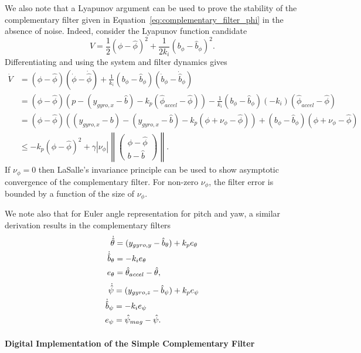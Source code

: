 We also note that a Lyapunov argument can be used to prove the stability of the complementary filter given in Equation~\eqref{eq:complementary_filter_phi} in the absence of noise.  Indeed, consider the Lyapunov function candidate
$$
V = \frac{1}{2}(\phi-\hat{\phi})^2 + \frac{1}{2k_i}(b_\phi-\hat{b}_\phi)^2.
$$
Differentiating and using the system and filter dynamics gives
\begin{align*}
\dot{V} &= (\phi - \hat{\phi})(\dot{\phi}-\dot{\hat{\phi}}) + \frac{1}{k_i}(b_\phi-\hat{b}_\phi)(\dot{b}_\phi - \dot{\hat{b}}_\phi) \\
&= (\phi - \hat{\phi})(p - (y_{gyro,x}-\hat{b}) - k_p (\hat{\phi}_{accel}-\hat{\phi})) - \frac{1}{k_i}(b_\phi-\hat{b}_\phi)(-k_i)(\hat{\phi}_{accel}-\hat{\phi}) \\
&= (\phi - \hat{\phi})((y_{gyro,x}-b) - (y_{gyro,x}-\hat{b}) - k_p (\phi + \nu_\phi -\hat{\phi})) + (b_\phi-\hat{b}_\phi)(\phi + \nu_\phi -\hat{\phi}) \\
&\leq -k_p (\phi-\hat{\phi})^2 + \gamma |\nu_\phi|\left\|\begin{pmatrix}\phi-\hat{\phi} \\ b-\hat{b}\end{pmatrix}\right\|.
\end{align*}
If $\nu_\phi=0$ then LaSalle's invariance principle can be used to show asymptotic convergence of the complementary filter.  For non-zero $\nu_\phi$, the filter error is bounded by a function of the size of $\nu_\phi$.

We note also that for Euler angle representation for pitch and yaw, a similar derivation results in the complementary filters
\begin{align}
\dot{\hat{\theta}} &= (y_{gyro,y}-\hat{b}_\theta) + k_p e_\theta \notag \\
\dot{\hat{b}}_\theta &= -k_i e_\theta \label{eq:complementary_filter_theta} \\
e_\theta &= \hat{\theta}_{accel}-\hat{\theta}, \notag
\end{align}
\begin{align}
\dot{\hat{\psi}} &= (y_{gyro,z}-\hat{b}_\psi) + k_p e_\psi \notag \\
\dot{\hat{b}}_\psi &= -k_i e_\psi \label{eq:complementary_filter_psi} \\
e_\psi &= \hat{\psi}_{mag}-\hat{\psi}.
\end{align}


\paragraph{Digital Implementation of the Simple Complementary Filter}

